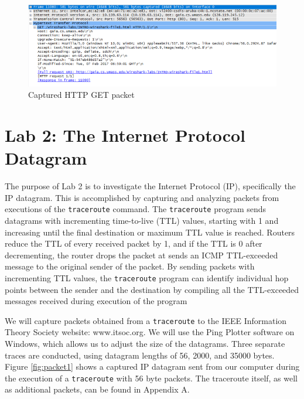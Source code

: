 \documentclass[10pt]{IEEEtran}
\begin{document}
\begin{figure}[h!]
	\includegraphics[width=\linewidth]{HTTP_GET.png}
	\caption{Captured HTTP GET packet}
	\label{fig:HTTPpacket}
\end{figure}

\section{Lab 2: The Internet Protocol Datagram}

 The purpose of Lab 2 is to investigate the Internet Protocol (IP), specifically the IP datagram. This is accomplished by capturing and analyzing packets from executions of the {\tt traceroute} command. The {\tt traceroute} program sends datagrams with incrementing time-to-live (TTL) values, starting with 1 and increasing until the final destination or maximum TTL value is reached. Routers reduce the TTL of every received packet by 1, and if the TTL is 0 after decrementing, the router drops the packet at sends an ICMP TTL-exceeded message to the original sender of the packet. By sending packets with incrementing TTL values, the {\tt traceroute} program can identify individual hop points between the sender and the destination by compiling all the TTL-exceeded messages received during execution of the program \cite{tanenbaum}
 
 We will capture packets obtained from a {\tt traceroute} to the IEEE Information Theory Society website: www.itsoc.org. We will use the Ping Plotter software on Windows, which allows us to adjust the size of the datagrams. Three separate traces are conducted, using datagram lengths of 56, 2000, and 35000 bytes. Figure \ref{fig:packet1} shows a captured IP datagram sent from our computer during the execution of a {\tt traceroute} with 56 byte packets. The traceroute itself, as well as additional packets, can be found in Appendix A.\\
 
\end{document}
